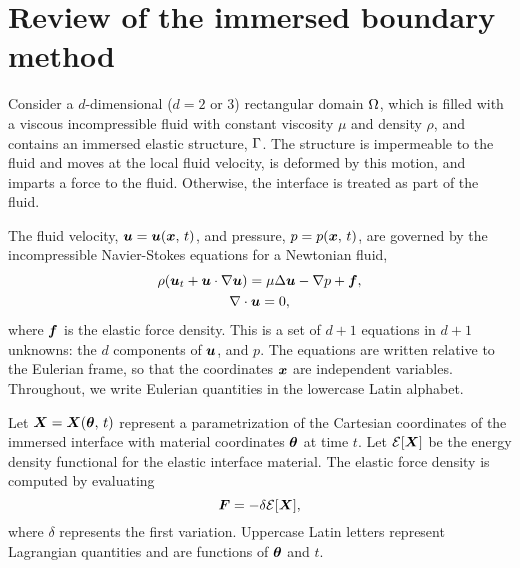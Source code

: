 \section{Review of the immersed boundary method} \label{sec:ib}

Consider a $d$-dimensional ($d=2$ or 3) rectangular domain $\Omega$, which is filled
with a viscous incompressible fluid with constant viscosity $\mu$ and density $\rho$, and
contains an immersed elastic structure, $\Gamma$. The structure is impermeable to the
fluid and moves at the local fluid velocity, is deformed by this motion, and imparts a
force to the fluid. Otherwise, the interface is treated as part of the fluid.

The fluid velocity, $\boldsymbol{u} = \boldsymbol{u}(\boldsymbol{x},\,t)$, and pressure, $p = p(\boldsymbol{x},\,t)$, are governed by the
incompressible Navier-Stokes equations for a Newtonian fluid,
\begin{gather}
    \label{eq:ins-evol}
    \rho(\u_t + \u\cdot\grad\u) = \mu\Delta\u - \grad p + \f, \\
    \label{eq:ins-incomp}
    \div\u = 0,
\end{gather}
where $\boldsymbol{f}$ is the elastic force density. This is a set of $d+1$ equations in $d+1$
unknowns: the $d$ components of $\boldsymbol{u}$, and $p$. The equations are written relative to the
Eulerian frame, so that the coordinates $\boldsymbol{x}$ are independent variables. Throughout, we
write Eulerian quantities in the lowercase Latin alphabet.

Let $\boldsymbol{X}=\boldsymbol{X}(\boldsymbol{\theta},\,t)$ represent a parametrization of the Cartesian coordinates of the
immersed interface with material coordinates $\boldsymbol{\theta}$ at time $t$. Let $\mathcal{E}[\boldsymbol{X}]$ be the
energy density functional for the elastic interface material. The elastic force density
is computed by evaluating%
\begin{equation}
    \label{eq:forces}
    \boldsymbol{F} = -\delta \mathcal{E}[\boldsymbol{X}],
\end{equation}
where $\delta$ represents the first variation. Uppercase Latin letters represent
Lagrangian quantities and are functions of $\boldsymbol{\theta}$ and $t$.

